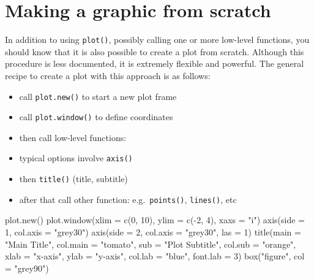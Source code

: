 \documentclass[
]{book}
\newenvironment{Shaded}{\begin{snugshade}}{\end{snugshade}}
\newcommand{\AttributeTok}[1]{\textcolor[rgb]{0.77,0.63,0.00}{#1}}
\newcommand{\DecValTok}[1]{\textcolor[rgb]{0.00,0.00,0.81}{#1}}
\newcommand{\FunctionTok}[1]{\textcolor[rgb]{0.00,0.00,0.00}{#1}}
\newcommand{\NormalTok}[1]{#1}
\newcommand{\SpecialCharTok}[1]{\textcolor[rgb]{0.00,0.00,0.00}{#1}}
\newcommand{\StringTok}[1]{\textcolor[rgb]{0.31,0.60,0.02}{#1}}
\begin{document}
\hypertarget{making-a-graphic-from-scratch}{%
\section{Making a graphic from scratch}\label{making-a-graphic-from-scratch}}

In addition to using \texttt{plot()}, possibly calling one or more low-level
functions, you should know that it is also possible to create a plot from
scratch. Although this procedure is less documented, it is extremely flexible
and powerful. The general recipe to create a plot with this approach is as
follows:

\begin{itemize}
\item
  call \texttt{plot.new()} to start a new plot frame
\item
  call \texttt{plot.window()} to define coordinates
\item
  then call low-level functions:
\item
  typical options involve \texttt{axis()}
\item
  then \texttt{title()} (title, subtitle)
\item
  after that call other function: e.g.~\texttt{points()}, \texttt{lines()}, etc
\end{itemize}

\begin{Shaded}
\begin{Highlighting}[]
\FunctionTok{plot.new}\NormalTok{()}
\FunctionTok{plot.window}\NormalTok{(}\AttributeTok{xlim =} \FunctionTok{c}\NormalTok{(}\DecValTok{0}\NormalTok{, }\DecValTok{10}\NormalTok{), }\AttributeTok{ylim =} \FunctionTok{c}\NormalTok{(}\SpecialCharTok{{-}}\DecValTok{2}\NormalTok{, }\DecValTok{4}\NormalTok{), }\AttributeTok{xaxs =} \StringTok{"i"}\NormalTok{)}
\FunctionTok{axis}\NormalTok{(}\AttributeTok{side =} \DecValTok{1}\NormalTok{, }\AttributeTok{col.axis =} \StringTok{"grey30"}\NormalTok{)}
\FunctionTok{axis}\NormalTok{(}\AttributeTok{side =} \DecValTok{2}\NormalTok{, }\AttributeTok{col.axis =} \StringTok{"grey30"}\NormalTok{, }\AttributeTok{las =} \DecValTok{1}\NormalTok{)}
\FunctionTok{title}\NormalTok{(}\AttributeTok{main =} \StringTok{"Main Title"}\NormalTok{,}
      \AttributeTok{col.main =} \StringTok{"tomato"}\NormalTok{,}
      \AttributeTok{sub =} \StringTok{"Plot Subtitle"}\NormalTok{,}
      \AttributeTok{col.sub =} \StringTok{"orange"}\NormalTok{,}
      \AttributeTok{xlab =} \StringTok{"x{-}axis"}\NormalTok{, }
      \AttributeTok{ylab =} \StringTok{"y{-}axis"}\NormalTok{,}
      \AttributeTok{col.lab =} \StringTok{"blue"}\NormalTok{, }
      \AttributeTok{font.lab =} \DecValTok{3}\NormalTok{)}
\FunctionTok{box}\NormalTok{(}\StringTok{"figure"}\NormalTok{, }\AttributeTok{col =} \StringTok{"grey90"}\NormalTok{)}
\end{Highlighting}
\end{Shaded}
\end{document}
